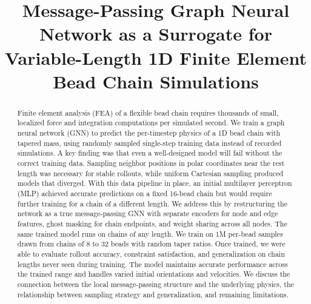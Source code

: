 \documentclass[conference]{IEEEtran}
\begin{document}
\title{Message-Passing Graph Neural Network as a Surrogate for Variable-Length 1D Finite Element Bead Chain Simulations}

\author{

}

\maketitle

\begin{abstract}
Finite element analysis (FEA) of a flexible bead chain requires thousands of small, localized force and integration computations per simulated second. We train a graph neural network (GNN) to predict the per-timestep physics of a 1D bead chain with tapered mass, using randomly sampled single-step training data instead of recorded simulations. A key finding was that even a well-designed model will fail without the correct training data. Sampling neighbor positions in polar coordinates near the rest length was necessary for stable rollouts, while uniform Cartesian sampling produced models that diverged. With this data pipeline in place, an initial multilayer perceptron (MLP) achieved accurate predictions on a fixed 16-bead chain but would require further training for a chain of a different length. We address this by restructuring the network as a true message-passing GNN with separate encoders for node and edge features, ghost masking for chain endpoints, and weight sharing across all nodes. The same trained model runs on chains of any length. We train on 1M per-bead samples drawn from chains of 8 to 32 beads with random taper ratios. Once trained, we were able to evaluate rollout accuracy, constraint satisfaction, and generalization on chain lengths never seen during training. The model maintains accurate performance across the trained range and handles varied initial orientations and velocities. We discuss the connection between the local message-passing structure and the underlying physics, the relationship between sampling strategy and generalization, and remaining limitations.
\end{abstract}
\end{document}

